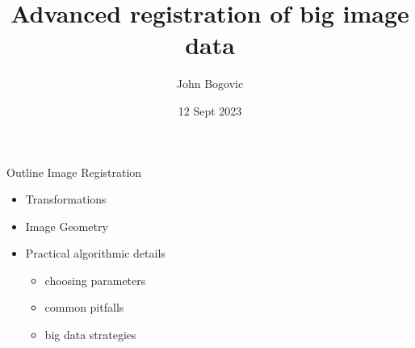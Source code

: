 \documentclass[aspectratio=169]{beamer}
\title[BigWarp]{\LARGE{Advanced registration of big image data} }
\author{John Bogovic}
\date{12 Sept 2023}
\begin{document}

\begin{frame}[plain]
  \titlepage
\end{frame}


\begin{frame}{Outline}
  Image Registration
  \vspace{1.0em}
  \begin{itemize}
      \setlength\itemsep{1.0em}
      \item Transformations
      \item Image Geometry
      \item Practical algorithmic details
      \begin{itemize}
          \setlength\itemsep{0.5em}
          \item choosing parameters
          \item common pitfalls
          \item big data strategies
      \end{itemize}
  \end{itemize}
\end{frame}
\end{document}
